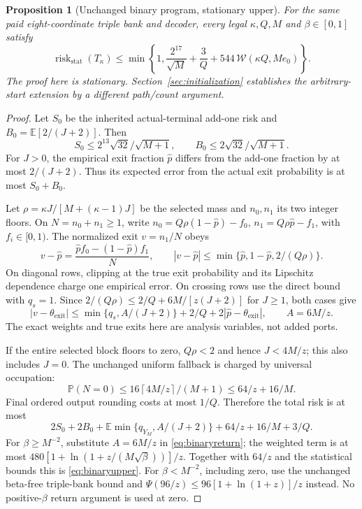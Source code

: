 \documentclass[11pt,letterpaper]{article}
\newtheorem{proposition}[theorem]{Proposition}
\theoremstyle{definition}\newtheorem{definition}[theorem]{Definition}
\theoremstyle{remark}\newtheorem{remark}[theorem]{Remark}
\newcommand{\E}{\mathbb{E}}
\newcommand{\Prob}{\mathbb{P}}
\newcommand{\ceil}[1]{\left\lceil #1\right\rceil}
\begin{document}
\begin{proposition}[Unchanged binary program, stationary upper]\label{prop:binaryupper}
For the same paid eight-coordinate triple bank and decoder, every legal $\kappa,Q,M$ and $\beta\in[0,1]$ satisfy
\begin{equation}\label{eq:binaryupper}
 \operatorname{risk}_{\mathrm{stat}}(T_\kappa)
 \le\min\left\{1,\frac{2^{17}}{\sqrt M}+\frac3Q+
 544\,\mathcal W(\kappa Q,Me_0)\right\}.
\end{equation}
The proof here is stationary. Section~\ref{sec:initialization} establishes the arbitrary-start extension by a different path/count argument.
\end{proposition}
\begin{proof}
Let $S_0$ be the inherited actual-terminal add-one risk and
$B_0=\E[2/(J+2)]$. Then
\[
 S_0\le2^{13}\sqrt{32}/\sqrt{M+1},\qquad
 B_0\le2\sqrt{32}/\sqrt{M+1}.
\]
For $J>0$, the empirical exit fraction $\widehat p$ differs from the add-one fraction by at most $2/(J+2)$. Thus its expected error from the actual exit probability is at most $S_0+B_0$.

Let $\rho=\kappa J/[M+(\kappa-1)J]$ be the selected mass and $n_0,n_1$ its two integer floors. On $N=n_0+n_1\ge1$, write
$n_0=Q\rho(1-\widehat p)-f_0$,
$n_1=Q\rho\widehat p-f_1$, with $f_i\in[0,1)$.
The normalized exit $v=n_1/N$ obeys
\[
 v-\widehat p=
 \frac{\widehat p f_0-(1-\widehat p)f_1}{N},\qquad
 |v-\widehat p|
 \le\min\{\widehat p,1-\widehat p,2/(Q\rho)\}.
\]
On diagonal rows, clipping at the true exit probability and its Lipschitz dependence charge one empirical error. On crossing rows use the direct bound with $q_s=1$. Since
$2/(Q\rho)\le2/Q+6M/[z(J+2)]$ for $J\ge1$, both cases give
\[
 |v-\theta_{\mathrm{exit}}|
 \le\min\{q_s,A/(J+2)\}+2/Q
       +2|\widehat p-\theta_{\mathrm{exit}}|,\qquad A=6M/z.
\]
The exact weights and true exits here are analysis variables, not added ports.

If the entire selected block floors to zero, $Q\rho<2$ and hence $J<4M/z$; this also includes $J=0$. The unchanged uniform fallback is charged by universal occupation:
\[
 \Prob(N=0)\le16\ceil{4M/z}/(M+1)\le64/z+16/M.
\]
Final ordered output rounding costs at most $1/Q$. Therefore the total risk is at most
\[
 2S_0+2B_0+\E\min\{q_{Y_M},A/(J+2)\}
       +64/z+16/M+3/Q.
\]
For $\beta\ge M^{-2}$, substitute $A=6M/z$ in
\eqref{eq:binaryreturn}; the weighted term is at most
$480[1+\ln(1+z/(M\sqrt\beta))]/z$.
Together with $64/z$ and the statistical bounds this is
\eqref{eq:binaryupper}. For $\beta<M^{-2}$, including zero, use the unchanged beta-free triple-bank bound and
$\Psi(96/z)\le96[1+\ln(1+z)]/z$ instead. No positive-$\beta$ return argument is used at zero.
\end{proof}
\end{document}
